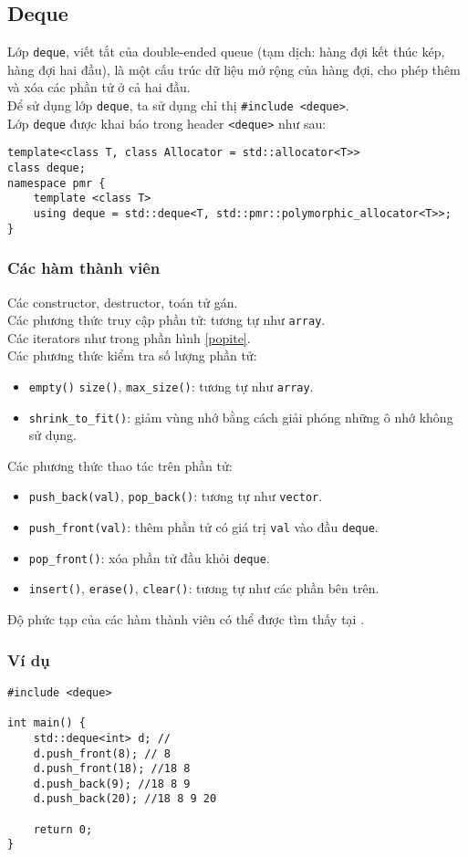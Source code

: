 \subsection{Deque}
Lớp \lstinline{deque}, viết tắt của double-ended queue (tạm dịch: hàng đợi kết thúc kép, hàng đợi hai đầu), là một cấu trúc dữ liệu mở rộng của hàng đợi, cho phép thêm và xóa các phần tử ở cả hai đầu.\\
Để sử dụng lớp \lstinline{deque}, ta sử dụng chỉ thị \lstinline{#include <deque>}.\\
Lớp \lstinline{deque} được khai báo trong header \lstinline{<deque>} như sau:\cite{deque}
\begin{lstlisting}
template<class T, class Allocator = std::allocator<T>> 
class deque;
namespace pmr {
    template <class T>
    using deque = std::deque<T, std::pmr::polymorphic_allocator<T>>;
}
\end{lstlisting}
\subsubsection{Các hàm thành viên}
Các constructor, destructor, toán tử gán.\\
Các phương thức truy cập phần tử: tương tự như \lstinline{array}.\\
Các iterators như trong phần hình \ref{popite}.\\
Các phương thức kiểm tra số lượng phần tử:
\begin{itemize}
    \item \lstinline{empty()} \lstinline{size()}, \lstinline{max_size()}: tương tự như \lstinline{array}.
    \item \lstinline{shrink_to_fit()}:  giảm vùng nhớ bằng cách giải phóng những ô nhớ không sử dụng.
\end{itemize}
Các phương thức thao tác trên phần tử:
\begin{itemize}
    \item \lstinline{push_back(val)}, \lstinline{pop_back()}: tương tự như \lstinline{vector}.
    \item \lstinline{push_front(val)}: thêm phần tử có giá trị \lstinline{val} vào đầu \lstinline{deque}.
    \item \lstinline{pop_front()}: xóa phần tử đầu khỏi \lstinline{deque}.
    \item \lstinline{insert()}, \lstinline{erase()}, \lstinline{clear()}: tương tự như các phần bên trên.
\end{itemize}
Độ phức tạp của các hàm thành viên có thể được tìm thấy tại \cite{deque}.
\subsubsection{Ví dụ}
\begin{lstlisting}
#include <deque>

int main() {
    std::deque<int> d; // 
    d.push_front(8); // 8
    d.push_front(18); //18 8
    d.push_back(9); //18 8 9
    d.push_back(20); //18 8 9 20
    
    return 0;
}
\end{lstlisting}